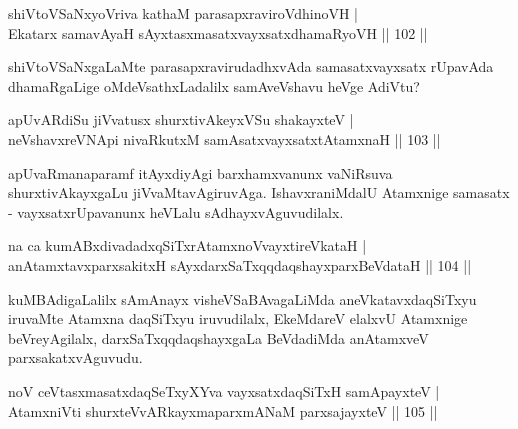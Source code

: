 
\begin{shl}
shiVtoVSaNxyoVriva kathaM parasapxraviroVdhinoVH |\\
Ekatarx samavAyaH sAyxtasxmasatxvayxsatxdhamaRyoVH \hfill || 102 ||
\end{shl}

\begin{artha}
shiVtoVSaNxgaLaMte parasapxravirudadhxvAda samasatxvayxsatx rUpavAda dhamaRgaLige oMdeVsathxLadalilx samAveVshavu heVge AdiVtu? 
\end{artha}


\begin{shl}
apUvARdiSu jiVvatusx shurxtivAkeyxVSu shakayxteV |\\
neVshavxreVNApi nivaRkutxM samAsatxvayxsatxtA\s \s tamxnaH \hfill || 103 ||
\end{shl}

\begin{artha}
apUvaRmanaparamf itAyxdiyAgi barxhamxvanunx vaNiRsuva shurxtivAkayxgaLu jiVvaMtavAgiruvAga. IshavxraniMdalU Atamxnige samasatx - vayxsatxrUpavanunx heVLalu sAdhayxvAguvudilalx.
\end{artha}


\begin{shl}
na ca kumABxdivadadxqSiTxrAtamxnoV\s vayxtireVkataH |\\
anAtamxtavxparxsakitxH sAyxdarxSaTxqqdaqshayxparxBeVdataH \hfill || 104 ||
\end{shl}

\begin{artha}
kuMBAdigaLalilx sAmAnayx visheVSaBAvagaLiMda aneVkatavxdaqSiTxyu iruvaMte Atamxna daqSiTxyu iruvudilalx, EkeMdareV elalxvU Atamxnige beVreyAgilalx, darxSaTxqq\ndash daqshayxgaLa BeVdadiMda anAtamxveV parxsakatxvAguvudu.
\end{artha}


\begin{shl}
noV ceVtasxmasatxdaqSeTxyXYva vayxsatxdaqSiTxH samApayxteV |\\
AtamxniVti shurxteVvARkayxmaparxmANaM parxsajayxteV \hfill || 105 ||
\end{shl}

